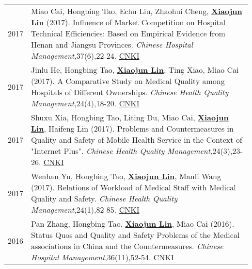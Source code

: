 \documentclass[a4paper,10pt]{article}
\begin{document}
\begin{longtable}{r p{13cm}}
2017 & Miao Cai, Hongbing Tao, Echu Liu, Zhaohui Cheng, \underline{\textbf{Xiaojun Lin}} (2017). Influence of Market Competition on Hospital Technical Efficiencies: Based on Empirical Evidence from Henan and Jiangsu Provinces. \emph{Chinese Hospital Management},37(6),22-24. \href{http://kns.cnki.net/KCMS/detail/detail.aspx?dbcode=CJFQ&dbname=CJFDLAST2017&filename=YYGL201706012&v=MzEzMTREbFZMdkFQRFRNWXJHNEg5Yk1xWTlFWm9SOGVYMUx1eFlTN0RoMVQzcVRyV00xRnJDVVJMS2VadVp0Rmk=}{CNKI}\\[5pt]

2017 & Jinlu He, Hongbing Tao, \underline{\textbf{Xiaojun Lin}}, Ting Xiao, Miao Cai (2017). A Comparative Study on Medical Quality among Hospitals of Different Ownerships. \emph{Chinese Health Quality Management},24(4),18-20. \href{http://kns.cnki.net/KCMS/detail/detail.aspx?dbcode=CJFQ&dbname=CJFDLAST2017&filename=WSJG201704010&v=MTU5NzM0OUVaSVI4ZVgxTHV4WVM3RGgxVDNxVHJXTTFGckNVUkxLZVp1WnRGaURtVTcvTU1qN0JhYkc0SDliTXE=}{CNKI}\\[5pt]

2017 & Shuxu Xia, Hongbing Tao, Liting Du, Miao Cai, \underline{\textbf{Xiaojun Lin}}, Haifeng Lin (2017). Problems and Countermeasures in Quality and Safety of Mobile Health Service in the Context of "Internet Plus". \emph{Chinese Health Quality Management},24(3),23-26. \href{http://kns.cnki.net/KCMS/detail/detail.aspx?dbcode=CJFQ&dbname=CJFDLAST2017&filename=WSJG201703030&v=MjQwMTVHWklSOGVYMUx1eFlTN0RoMVQzcVRyV00xRnJDVVJMS2VadVp0RmlEbVViL01NajdCYWJHNEg5Yk1ySTk=}{CNKI}\\[5pt]

2017 & Wenhan Yu, Hongbing Tao, \underline{\textbf{Xiaojun Lin}}, Manli Wang (2017). Relations of Workload of Medical Staff with Medical Quality and Safety. \emph{Chinese Health Quality Management},24(1),82-85. \href{http://kns.cnki.net/KCMS/detail/detail.aspx?dbcode=CJFQ&dbname=CJFDLAST2017&filename=WSJG201701013&v=MDI5NThSOGVYMUx1eFlTN0RoMVQzcVRyV00xRnJDVVJMS2VadVp0RmlEbVY3M09NajdCYWJHNEg5Yk1ybzlFWjQ=}{CNKI}\\[5pt]

2016 & Pan Zhang, Hongbing Tao,  \underline{\textbf{Xiaojun Lin}}, Miao Cai (2016). Status Quos and Quality and Safety Problems of the Medical associations in China and the Countermeasures. \emph{Chinese Hospital Management},36(11),52-54. \href{http://kns.cnki.net/KCMS/detail/detail.aspx?dbcode=CJFQ&dbname=CJFDLAST2016&filename=YYGL201611027&v=MjM5Mjl1WnNGaXZtVTcvS1BEVE1Zckc0SDlmTnJvOUhZNFI4ZVgxTHV4WVM3RGgxVDNxVHJXTTFGckNVUkxLZVo=}{CNKI}\\[5pt]




\end{longtable}
\end{document}
